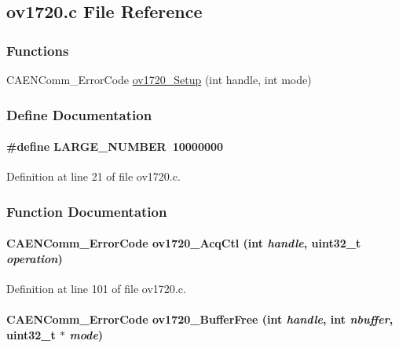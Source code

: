 \subsection{ov1720.c File Reference}
\label{ov1720_8c}
\subsubsection*{Functions}
\begin{DoxyCompactItemize}
\item 
CAENComm\_\-ErrorCode \hyperlink{ov1720_8c_a31f37ce79cfd3a277fcc2856b027ef85}{ov1720\_\-Setup} (int handle, int mode)
\end{DoxyCompactItemize}


\subsubsection{Define Documentation}
\paragraph[{LARGE\_\-NUMBER}]{\setlength{\rightskip}{0pt plus 5cm}\#define LARGE\_\-NUMBER~10000000}\hfill\label{ov1720_8c_a72e1d1d4b3243f4e7ec115f199298e34}


Definition at line 21 of file ov1720.c.

\subsubsection{Function Documentation}
\paragraph[{ov1720\_\-AcqCtl}]{\setlength{\rightskip}{0pt plus 5cm}CAENComm\_\-ErrorCode ov1720\_\-AcqCtl (int {\em handle}, \/  uint32\_\-t {\em operation})}\hfill\label{ov1720_8c_a283d9c293f1936fa51128298980aa6ff}


Definition at line 101 of file ov1720.c.
\paragraph[{ov1720\_\-BufferFree}]{\setlength{\rightskip}{0pt plus 5cm}CAENComm\_\-ErrorCode ov1720\_\-BufferFree (int {\em handle}, \/  int {\em nbuffer}, \/  uint32\_\-t $\ast$ {\em mode})}\hfill\label{ov1720_8c_a3c45a9b83fe184343eb075da778ce4e9}


